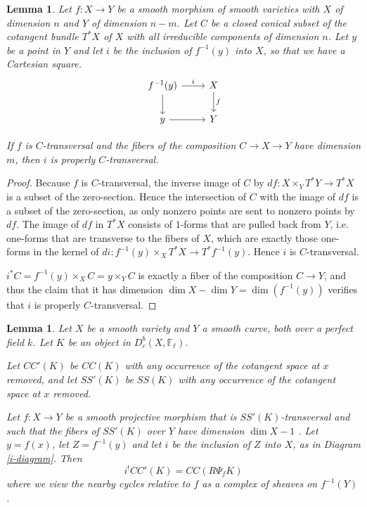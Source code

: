 \documentclass[12pt]{amsart}
\newtheorem{lemma}[theorem]{Lemma}
\theoremstyle{definition}
\theoremstyle{remark}
\begin{document}
\begin{lemma}\label{transversality-check} Let $f: X \to Y$ be a smooth morphism of smooth varieties with $X$ of dimension $n$ and $Y$ of dimension $n-m$. Let $C$ be a closed conical subset of the cotangent bundle $T^* X$ of $X$ with all irreducible components of dimension  $n$. Let $y$ be a point in $Y$ and let $i$ be the inclusion of $f^{-1}(y)$ into $X$, so that we have a Cartesian square. \begin{equation}\label{i-diagram}\begin{tikzcd} f^{-1}(y) \arrow[r,"i"] \arrow[d] & X \arrow[d,"f"] \\ y \arrow[r] & Y \end{tikzcd}\end{equation}

 If $f$ is $C$-transversal and the fibers of the composition $C \to X \to Y$ have dimension $m$, then $i$ is properly $C$-transversal. \end{lemma}

\begin{proof} Because $f$ is $C$-transversal, the inverse image of $C$ by $df: X \times_Y T^* Y \to T^* X$ is a subset of the zero-section. Hence the intersection of $C$ with the image of $df$ is a subset of the zero-section, as only nonzero points are sent to nonzero points by $df$. The image of $df$ in $T^* X$ consists of $1$-forms that are pulled back from $Y$, i.e. one-forms that are transverse to the fibers of $X$, which are exactly those one-forms in the kernel of $di: f^{-1}(y) \times_X T^* X \to T^* f^{-1}(y)$. Hence $i$ is $C$-transversal.

$i^* C = f^{-1}(y) \times_X C =  y \times_Y C$ is exactly a fiber of the composition $C \to Y$, and thus the claim that it has dimension $\dim X - \dim Y = \dim (f^{-1}(y))$ verifies that $i$ is properly $C$-transversal.

\end{proof}


\begin{lemma}\label{nearby-formula} Let $X$ be a smooth variety and $Y$ a smooth curve, both over a perfect field $k$. Let $K$ be an object in $D^b_c(X,\mathbb F_\ell)$.

Let $CC'(K)$ be $CC(K)$ with any occurrence of the cotangent space at $x$ removed, and let $SS'(K)$ be $SS(K)$ with any occurrence of the cotangent space at $x$ removed. 

Let  $f: X \to Y$ be a smooth projective morphism that is $SS'(K)$-transversal and such that the fibers of $SS'(K)$ over $Y$ have dimension $\dim X-1$ . Let $y=f(x)$, let $Z =f^{-1}(y)$ and let $i$ be the inclusion of $Z$ into $X$, as in Diagram \ref{i-diagram}.  Then 
\[i^! CC'(K) = CC ( R \Psi_{f} K) \]
where we view the nearby cycles relative to $f$ as a complex of sheaves on $f^{-1}(Y)$. \end{lemma}
\end{document}
